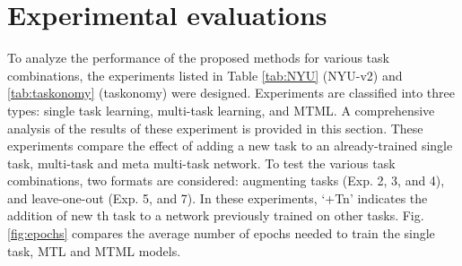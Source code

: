 \documentclass[conference]{IEEEtran}
\begin{document}
\section{Experimental evaluations}\label{sec:diss_of_results}
To analyze the performance of the proposed methods for various task combinations, the experiments listed in Table \ref{tab:NYU} (NYU-v2) and \ref{tab:taskonomy} (taskonomy) were designed.
Experiments are classified into three types: single task learning, multi-task learning, and \ac{MTML}. 
A comprehensive analysis of the results of these experiment is provided in this section.
These experiments compare the effect of adding a new task to an already-trained single task, multi-task and meta multi-task network.
To test the various task combinations, two formats are considered: augmenting tasks (Exp. 2, 3, and 4), and leave-one-out (Exp. 5, and 7).
In these experiments, `+Tn' indicates the addition of new th task to a network previously trained on other tasks.
Fig. \ref{fig:epochs} compares the average number of epochs needed to train the single task, \ac{MTL} and \ac{MTML} models.
\end{document}
